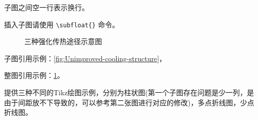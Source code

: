 子图之间空一行表示换行。

插入子图请使用 \verb|\subfloat{}| 命令。

\begin{figure}[htb]

    \caption{三种强化传热途径示意图}
    \label{fig:Three-enhanced-heat-transfer-paths}
\end{figure}

子图引用示例：\cref{fig:Unimproved-cooling-structure}，

整图引用示例：\cref{fig:Three-enhanced-heat-transfer-paths}。

提供三种不同的Tikz绘图示例，分别为柱状图(第一个子图存在问题是少一列，是由于间距放不下导致的，可以参考第二张图进行对应的修改)，多点折线图，少点折线图。

